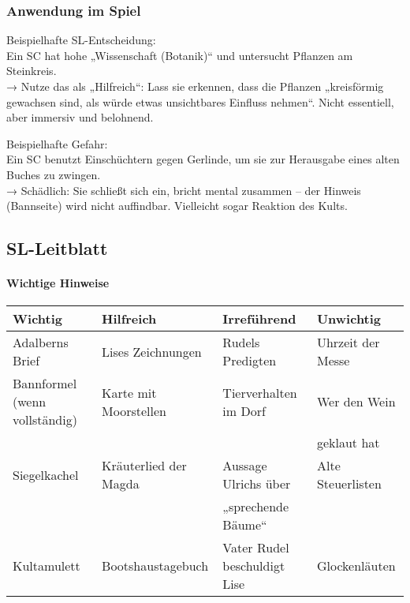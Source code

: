 \subsubsection*{Anwendung im Spiel}
Beispielhafte SL-Entscheidung:\\
Ein SC hat hohe „Wissenschaft (Botanik)“ und untersucht Pflanzen am Steinkreis.\\
→ Nutze das als „Hilfreich“: Lass sie erkennen, dass die Pflanzen „kreisförmig gewachsen sind, als würde etwas unsichtbares Einfluss nehmen“.
Nicht essentiell, aber immersiv und belohnend.

Beispielhafte Gefahr:\\
Ein SC benutzt Einschüchtern gegen Gerlinde, um sie zur Herausgabe eines alten Buches zu zwingen.\\
→ Schädlich: Sie schließt sich ein, bricht mental zusammen – der Hinweis (Bannseite) wird nicht auffindbar. Vielleicht sogar Reaktion des Kults.

\newpage
\subsection{SL-Leitblatt}
\paragraph{Wichtige Hinweise}
\begin{center}
\begin{tabular}{llll}
\toprule
Wichtig & Hilfreich & Irreführend & Unwichtig\\
\midrule
Adalberns Brief & Lises Zeichnungen & Rudels Predigten & Uhrzeit der Messe\\
\midrule
Bannformel (wenn vollständig) & Karte mit Moorstellen & Tierverhalten im Dorf & Wer den Wein\\
&&& geklaut hat\\
\midrule
Siegelkachel & Kräuterlied der Magda & Aussage Ulrichs über & Alte Steuerlisten\\
&&„sprechende Bäume“ &\\
\midrule
Kultamulett & Bootshaustagebuch & Vater Rudel beschuldigt Lise & Glockenläuten\\
\bottomrule
\end{tabular}
\end{center}

